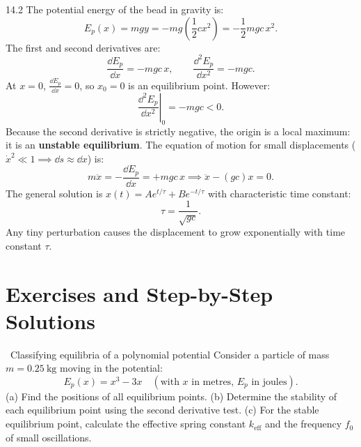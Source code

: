 \begin{solution}{14.2}
The potential energy of the bead in gravity is:
\[
E_p(x) = mgy = -mg\left(\frac{1}{2}c x^2\right) = -\frac{1}{2}mgc\,x^2.
\]
The first and second derivatives are:
\[
\frac{\dd E_p}{\dd x} = -mgc\,x,\qquad \frac{\dd^2 E_p}{\dd x^2} = -mgc.
\]
At $x = 0$, $\frac{\dd E_p}{\dd x} = 0$, so $x_0 = 0$ is an equilibrium point.
However:
\[
\left.\frac{\dd^2 E_p}{\dd x^2}\right|_{0} = -mgc < 0.
\]
Because the second derivative is strictly negative, the origin is a local maximum: it is an \textbf{unstable equilibrium}.
The equation of motion for small displacements ($\dot{x}^2 \ll 1 \implies \dd s \approx \dd x$) is:
\[
m\ddot{x} = -\frac{\dd E_p}{\dd x} = +mgc\,x \implies \ddot{x} - (gc)x = 0.
\]
The general solution is $x(t) = A e^{t/\tau} + B e^{-t/\tau}$ with characteristic time constant:
\[
\boxed{\tau = \frac{1}{\sqrt{gc}}.}
\]
Any tiny perturbation causes the displacement to grow exponentially with time constant $\tau$.
\end{solution}

\section{Exercises and Step-by-Step Solutions}

\begin{exercise}{\warm\ Classifying equilibria of a polynomial potential}
Consider a particle of mass $m=0.25\ \mathrm{kg}$ moving in the potential:
\[
E_p(x) = x^3 - 3x\quad (\text{with } x \text{ in metres, } E_p \text{ in joules}).
\]
(a) Find the positions of all equilibrium points.
(b) Determine the stability of each equilibrium point using the second derivative test.
(c) For the stable equilibrium point, calculate the effective spring constant $k_{\text{eff}}$ and the frequency $f_0$ of small oscillations.
\end{exercise}

\begin{tabletworkspace}[5.0cm]
\end{tabletworkspace}

